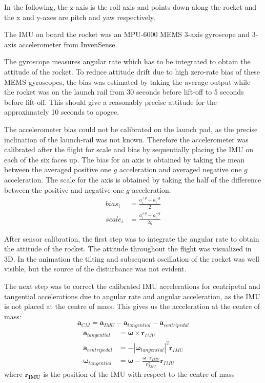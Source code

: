 In the following, the z-axis is the roll axis and points down along the rocket and the x and y-axes are pitch and yaw respectively.

The IMU on board the rocket was an MPU-6000 MEMS 3-axis gyroscope and 3-axis accelerometer from InvenSense.

The gyroscope measures angular rate which has to be integrated to obtain the attitude of the rocket.
To reduce attitude drift due to high zero-rate bias of these MEMS gyroscopes, the bias was estimated by taking the average output while the rocket was on the launch rail from 30 seconds before lift-off to 5 seconds before lift-off.
This should give a reasonably precise attitude for the approximately 10 seconds to apogee.

The accelerometer bias could not be calibrated on the launch pad, as the precise inclination of the launch-rail was not known.
Therefore the accelerometer was calibrated after the flight for scale and bias by sequentially placing the IMU on each of the six faces up.
The bias for an axis is obtained by taking the mean between the averaged positive one $g$ acceleration and averaged negative one $g$ acceleration.
The scale for the axis is obtained by taking the half of the difference between the positive and negative one $g$ acceleration.
\begin{align}
    bias_i &= \frac{a^{+g}_i + a^{-g}_i}{2} \\
    scale_i &= \frac{a^{+g}_i - a^{-g}_i}{2g}
\end{align}


After sensor calibration, the first step was to integrate the angular rate to obtain the attitude of the rocket.
The attitude throughout the flight was visualized in 3D.
In the animation the tilting and subsequent oscillation of the rocket was well visible, but the source of the disturbance was not evident.


The next step was to correct the calibrated IMU accelerations for centripetal and tangential accelerations due to angular rate and angular acceleration, as the IMU is not placed at the centre of mass. This gives us the acceleration at the centre of mass:
\begin{equation}
    \bm{a}_{CM} = \bm{a}_{IMU} - \bm{a}_{tangential} - \bm{a}_{centripedal}
\end{equation}
\begin{equation}
\begin{split}
    \bm{a}_{tangential} &= \bm{\dot\omega} \times \bm{r}_{IMU} \\
    \bm{a}_{centripedal} &= - |\bm{\omega}_{tangential}|^2  \bm{r}_{IMU} \\
    \bm{\omega}_{tangential} &= \bm{\omega} - \frac{\bm{\omega} \cdot \bm{r}_{IMU}}{\bm{r}_{IMU}^2}\bm{r}_{IMU}
\end{split}
\end{equation}
where $\bm{r_{IMU}}$ is the position of the IMU with respect to the centre of mass

